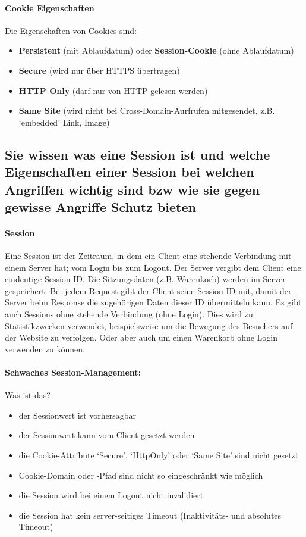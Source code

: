 \documentclass[10pt,a4paper]{article}
\begin{document}
\paragraph*{Cookie Eigenschaften}Die Eigenschaften von Cookies sind:
\begin{itemize}[noitemsep,topsep=0pt,leftmargin=*]
    \item \textbf{Persistent} (mit Ablaufdatum) oder \textbf{Session-Cookie} (ohne Ablaufdatum)
    \item \textbf{Secure} (wird nur über HTTPS übertragen)
    \item \textbf{HTTP Only} (darf nur von HTTP gelesen werden)
    \item \textbf{Same Site} (wird nicht bei Cross-Domain-Aurfrufen mitgesendet, z.B. `embedded' Link, Image)
\end{itemize}

\subsection*{Sie wissen was eine Session ist und welche Eigenschaften einer Session bei welchen Angriffen wichtig sind bzw wie sie gegen gewisse Angriffe Schutz bieten}
\paragraph*{Session} Eine Session ist der Zeitraum, in dem ein Client eine stehende Verbindung mit einem Server hat; vom Login bis zum Logout. Der Server vergibt dem Client eine eindeutige Session-ID. Die Sitzungsdaten (z.B. Warenkorb) werden im Server gespeichert. Bei jedem Request gibt der Client seine Session-ID mit, damit der Server beim Response die zugehörigen Daten dieser ID übermitteln kann. Es gibt auch Sessions ohne stehende Verbindung (ohne Login). Dies wird zu Statistikzwecken verwendet, beispielsweise um die Bewegung des Besuchers auf der Website zu verfolgen. Oder aber auch um einen Warenkorb ohne Login verwenden zu können.
\paragraph*{Schwaches Session-Management:} Was ist das?
\begin{itemize}[noitemsep,topsep=0pt,leftmargin=*]
    \item der Sessionwert ist vorhersagbar
    \item der Sessionwert kann vom Client gesetzt werden
    \item die Cookie-Attribute `Secure', `HttpOnly' oder `Same Site' sind nicht gesetzt
    \item Cookie-Domain oder -Pfad sind nicht so eingeschränkt wie möglich
    \item die Session wird bei einem Logout nicht invalidiert
    \item die Session hat kein server-seitiges Timeout (Inaktivitäts- und absolutes Timeout)
\end{itemize}
\end{document}
